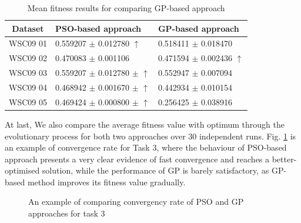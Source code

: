 \documentclass{IEEEtran}
\begin{document}
\begin{table}[]
\centering
\caption{Mean fitness results for comparing GP-based approach}
\label{meanFitness}
\begin{tabular}{l|l|l}
\hline
\multicolumn{1}{c|}{Dataset} & PSO-based approach & GP-based approach  \\ \hline
WSC09 01                     &0.559207 $\pm$ 0.012780 $\uparrow$      &0.518411 $\pm$ 0.018470               \\ \hline
WSC09 02                     &0.470083 $\pm$  0.001106   &0.471594 $\pm$  0.002436 $\uparrow$           \\ \hline
WSC09 03                     & 0.559207 $\pm$ 0.012780 $\pm$ $\uparrow$  &0.552947 $\pm$ 0.007094            \\ \hline
WSC09 04                     & 0.468942 $\pm$ 0.001670 $\pm$ $\uparrow$  &0.442934 $\pm$ 0.010154            \\ \hline
WSC09 05                     & 0.469424 $\pm$ 0.000800 $\pm$ $\uparrow$  &0.256425 $\pm$ 0.038916            \\ \hline
\end{tabular}
\end{table}

At last, We also compare the average fitness value with optimum through the evolutionary process for both two approaches over 30 independent runs. Fig. \ref{psovsgp} is an example of convergence rate for Task 3, where the behaviour of PSO-based approach presents a very clear evidence of fast convergence and reaches a better-optimised solution, while the performance of GP is barely satisfactory, as GP-based method improves its fitness value gradually.


\begin{figure}[h]
\centering
{}
 \caption{An example of comparing convergency rate of PSO and GP approaches for task 3}
 \label{psovsgp}
\end{figure}
\end{document}
